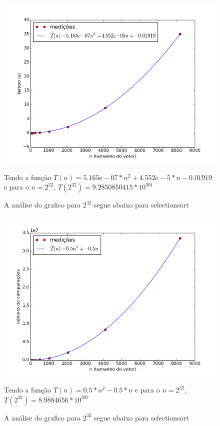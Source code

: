 \documentclass[12pt,a4paper,twoside]{report}
\begin{document}


\begin{figure}[ht]
\centering \includegraphics[scale=0.8]{../selectionsort/imagens/selectionsortQuaseDecresc500.png}
\caption{A análise do grafico para $2^{32}$ segue abaixo para selectionsort}

Tendo a função $T(n) = 5.165\mathrm{e}-07*n^{2}+4.552\mathrm{e}-5*n-0.01919$ e para o $n =2^{32}$, $T(2^{32}) =9.2850850415 * 10^{301}$
\label{fig:selectionsortQuaseDecresc500}
\end{figure}

\begin{figure}[ht]
\centering \includegraphics[scale=0.8]{../selectionsort/imagens/selectionsortQuaseDecresc501.png}
\caption{A análise do grafico para $2^{32}$ segue abaixo para selectionsort}

Tendo a função $T(n) = 0.5*n^{2}-0.5*n$ e para o $n =2^{32}$, $T(2^{32}) =8.9884656 * 10^{307}$
\label{fig:selectionsortQuaseDecresc501}
\end{figure}
\end{document}
